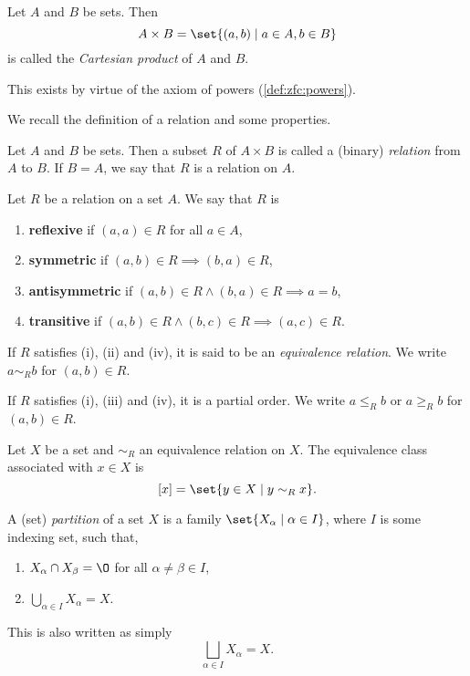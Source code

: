 
\begin{definition} \label{def:cartesian_product}
    Let $A$ and $B$ be sets.
    Then \[
        A \times B = \set{(a, b) \mid a \in A, b \in B}
    \] is called the \emph{Cartesian product} of $A$ and $B$.
\end{definition}
This exists by virtue of the axiom of powers (\ref{def:zfc:powers}).

We recall the definition of a relation and some properties.
\begin{definition}[Relation] \label{def:relation}
    Let $A$ and $B$ be sets.
    Then a subset $R$ of $A \times B$ is called a (binary) \emph{relation}
    from $A$ to $B$.
    If $B = A$, we say that $R$ is a relation on $A$.
\end{definition}
\begin{definition*}
    Let $R$ be a relation on a set $A$.
    We say that $R$ is
    \begin{enumerate}
        \item \textbf{reflexive} if $(a, a) \in R$ for all $a \in A$,
        \item \textbf{symmetric} if $(a, b) \in R \implies (b, a) \in R$,
        \item \textbf{antisymmetric} if $(a, b) \in R \land (b, a) \in R
        \implies a = b$,
        \item \textbf{transitive} if $(a, b) \in R \land (b, c) \in R
        \implies (a, c) \in R$.
    \end{enumerate}
    If $R$ satisfies (i), (ii) and (iv), it is said to be an
    \emph{equivalence relation}.
    We write $a \sim_R b$ for $(a, b) \in R$.

    If $R$ satisfies (i), (iii) and (iv), it is a partial order.
    We write $a \le_R b$ or $a \ge_R b$ for $(a, b) \in R$.
\end{definition*}

\begin{definition} \label{def:equivalence_class}
    Let $X$ be a set and $\sim_R$ an equivalence relation on $X$.
    The equivalence class associated with $x \in X$ is \[
        [x] = \set{y \in X \mid y \sim_R x}.
    \]
\end{definition}

\begin{definition}[Partition] \label{def:partition}
    A (set) \emph{partition} of a set $X$ is a family $\set{X_\alpha \mid
    \alpha \in I}$, where $I$ is some indexing set, such that,
    \begin{enumerate}
        \item $X_\alpha \cap X_\beta = \O$ for all $\alpha \ne \beta \in I$,
        \item $\bigcup_{\alpha \in I} X_\alpha = X$.
    \end{enumerate}
    This is also written as simply \[
        \bigsqcup_{\alpha \in I} X_\alpha = X.
    \]
\end{definition}

